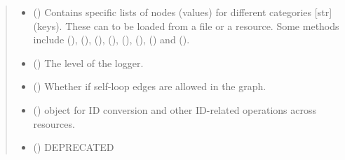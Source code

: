 \documentclass[letterpaper,10pt,english]{sphinxmanual}
\begin{document}
\begin{fulllineitems}
\begin{quote}
\begin{description}
\begin{itemize}
\item {} 
 () \textendash{} Contains specific lists of nodes (values) for different
categories {[}str{]} (keys). These can to be loaded from a file or
a resource. Some methods include 
(), {\hyperref[\detokenize{main:pypath.main.PyPath.druggability_list}]{}} (),
{\hyperref[\detokenize{main:pypath.main.PyPath.kinases_list}]{}} (),
{\hyperref[\detokenize{main:pypath.main.PyPath.tfs_list}]{}} (),
{\hyperref[\detokenize{main:pypath.main.PyPath.disease_genes_list}]{}} (),
{\hyperref[\detokenize{main:pypath.main.PyPath.signaling_proteins_list}]{}} (),
{\hyperref[\detokenize{main:pypath.main.PyPath.proteome_list}]{}} () and
{\hyperref[\detokenize{main:pypath.main.PyPath.cancer_drivers_list}]{}} ().

\item {} 
 () \textendash{} The level of the logger.

\item {} 
 () \textendash{} Whether if self-loop edges are allowed in the graph.

\item {} 
 () \textendash{}  object for ID conversion and
other ID-related operations across resources.

\item {} 
 () \textendash{} DEPRECATED


\end{itemize}
\end{description}
\end{quote}
\end{fulllineitems}
\end{document}
